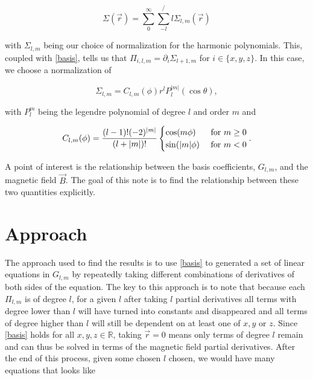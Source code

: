 \documentclass{article}
\begin{document}
\begin{equation}
    \Sigma(\vec r)=\sum_{0}^\infty\sum_{-l}^/l\Sigma_{l, m}(\vec r)
\end{equation}

with $\Sigma_{l, m}$ being our choice of normalization for the harmonic polynomials. This, coupled with \ref{basis}, tells us that $\Pi_{i, l, m}=\partial_i\Sigma_{l+1, m}$ for $i\in\{x, y, z\}$. In this case, we choose a normalization of

\begin{equation}
    \Sigma_{l, m}=C_{l, m}(\phi)r^lP_l^{|m|}(\cos\theta), 
\end{equation}

with $P_l^m$ being the legendre polynomial of degree $l$ and order $m$ and

\begin{equation}
    C_{l, m}(\phi)=\frac{(l-1)!(-2)^{|m|}}{(l+|m|)!}\begin{cases}
        \cos(m\phi)&\textnormal{ for } m\geq0\\
        \sin(|m|\phi)&\textnormal{ for }m<0
    \end{cases}.
\end{equation}

A point of interest is the relationship between the basis coefficients, $G_{l, m}$, and the magnetic field $\vec B$. The goal of this note is to find the relationship between these two quantities explicitly. 

\section{Approach}

The approach used to find the results is to use \ref{basis} to generated a set of linear equations in $G_{l, m}$ by repeatedly taking different combinations of derivatives of both sides of the equation. The key to this approach is to note that because each $\Pi_{l,m}$ is of degree $l$, for a given $l$ after taking $l$ partial derivatives all terms with degree lower than $l$ will have turned into constants and disappeared and all terms of degree higher than $l$ will still be dependent on at least one of $x, y$ or $z$. Since \ref{basis} holds for all $x, y, z\in\mathbb{R}$, taking $\vec r=0$ means only terms of degree $l$ remain and can thus be solved in terms of the magnetic field partial derivatives. After the end of this process, given some chosen $l$ chosen, we would have many equations that looks like 
\end{document}
